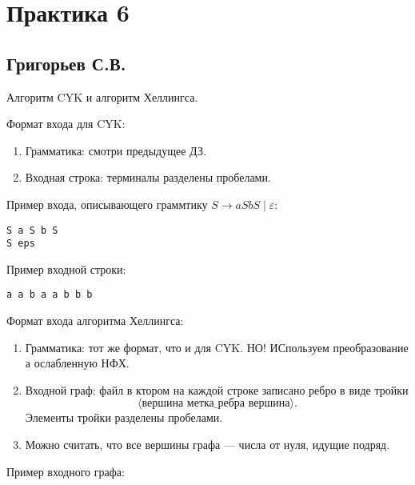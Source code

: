 \section{Практика 6}

\subsection{Григорьев С.В.}

Алгоритм CYK и алгоритм Хеллингса.

Формат входа для CYK:
\begin{enumerate}
\item Грамматика: смотри предыдущее ДЗ.
\item Входная строка: терминалы разделены пробелами.
\end{enumerate}

Пример входа, описывающего граммтику $S \to a S b S \mid \varepsilon$:

\begin{verbatim}
S a S b S
S eps
\end{verbatim}

Пример входной строки:
\begin{verbatim}
a a b a a b b b
\end{verbatim}


Формат входа алгоритма Хеллингса:
\begin{enumerate}
\item Грамматика: тот же формат, что и для CYK. НО! ИСпользуем преобразование а ослабленную НФХ.
\item Входной граф: файл в ктором на каждой строке записано ребро в виде тройки
$$
\langle\textit{вершина } \textit{метка\_ребра} \textit{ вершина}\rangle.
$$
Элементы тройки разделены пробелами.
\item Можно считать, что все вершины графа --- числа от нуля, идущие подряд.
\end{enumerate}

Пример входного графа:

\begin{center}
\end{center}


